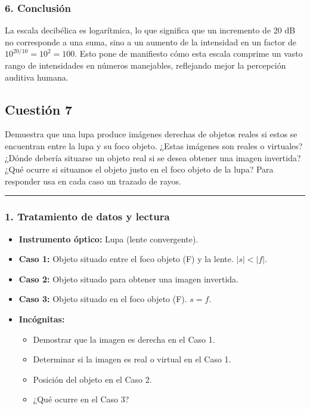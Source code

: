 \subsubsection*{6. Conclusión}
\begin{cajaconclusion}
La escala decibélica es logarítmica, lo que significa que un incremento de 20 dB no corresponde a una suma, sino a un aumento de la intensidad en un factor de $10^{20/10} = 10^2 = 100$. Esto pone de manifiesto cómo esta escala comprime un vasto rango de intensidades en números manejables, reflejando mejor la percepción auditiva humana.
\end{cajaconclusion}

\newpage

\subsection{Cuestión 7}
\label{subsec:C7_2023_jul_ord}

\begin{cajaenunciado}
Demuestra que una lupa produce imágenes derechas de objetos reales si estos se encuentran entre la lupa y su foco objeto. ¿Estas imágenes son reales o virtuales? ¿Dónde debería situarse un objeto real si se desea obtener una imagen invertida? ¿Qué ocurre si situamos el objeto justo en el foco objeto de la lupa? Para responder usa en cada caso un trazado de rayos.
\end{cajaenunciado}
\hrule

\subsubsection*{1. Tratamiento de datos y lectura}
\begin{itemize}
    \item \textbf{Instrumento óptico:} Lupa (lente convergente).
    \item \textbf{Caso 1:} Objeto situado entre el foco objeto (F) y la lente. $|s| < |f|$.
    \item \textbf{Caso 2:} Objeto situado para obtener una imagen invertida.
    \item \textbf{Caso 3:} Objeto situado en el foco objeto (F). $s = f$.
    \item \textbf{Incógnitas:}
    \begin{itemize}
        \item Demostrar que la imagen es derecha en el Caso 1.
        \item Determinar si la imagen es real o virtual en el Caso 1.
        \item Posición del objeto en el Caso 2.
        \item ¿Qué ocurre en el Caso 3?
    \end{itemize}
\end{itemize}

